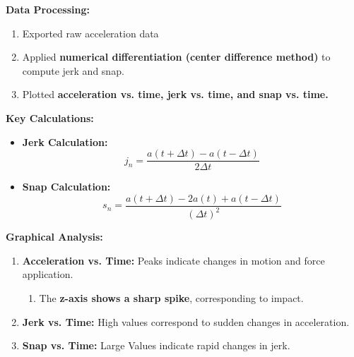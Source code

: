 \documentclass[idxtotoc,hyperref,openany]{labbook} %
\begin{document}
\textbf{Data Processing:}
\begin{enumerate}[$\bullet$]
    \item Exported raw acceleration data
    \item Applied \textbf{numerical differentiation (center difference method)} to compute jerk and snap.
    \item Plotted \textbf{acceleration vs. time, jerk vs. time, and snap vs. time.}
\end{enumerate}
\textbf{Key Calculations:}
\begin{itemize}
    \item \textbf{Jerk Calculation:}
    \[
    j_n = \frac{a(t+\Delta t) - a(t-\Delta t)}{2\Delta t}
    \]
    
    \item \textbf{Snap Calculation:}
    \[
    s_n = \frac{a(t+\Delta t) - 2a(t) + a(t-\Delta t)}{(\Delta t)^2}
    \]
\end{itemize}
\textbf{Graphical Analysis:}
\begin{enumerate}[$\bullet$]
    \item \textbf{Acceleration vs. Time:} Peaks indicate changes in motion and force application.
    \begin{enumerate}[$\bullet$]
        \item The \textbf{z-axis shows a sharp spike}, corresponding to impact.
    \end{enumerate}
    \item \textbf{Jerk vs. Time:} High values correspond to sudden changes in acceleration.
    \item \textbf{Snap vs. Time:} Large Values indicate rapid changes in jerk.
\end{enumerate}

\end{document}
